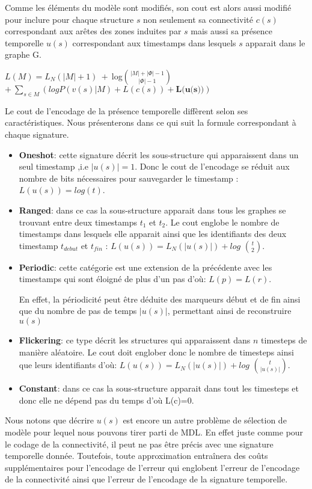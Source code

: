 \documentclass[11pt,a4paper]{report}
\theoremstyle{definition}
\begin{document}
			 Comme les éléments du modèle sont modifiés, son cout est alors aussi modifié pour inclure pour chaque structure $s$ non seulement sa connectivité $c(s)$ correspondant aux arêtes des zones induites par $s$ mais aussi sa présence temporelle $u(s)$ correspondant aux timestamps dans lesquels $s$ apparait dans le graphe G. 
			 
			 $L(M) = L_{N}(|M|+1)\ +\ $log${|M|+|\Phi|-1}\choose{|\Phi|-1}$ $+\ \displaystyle{\sum_{s\in M}(logP(v(s)|M) + L(c(s)) + \textbf{L(u(s))})}$
			 
			 Le cout de l'encodage de la présence temporelle diffèrent selon ses caractéristiques. Nous présenterons dans ce qui suit la formule correspondant à chaque signature.
			 
			 \begin{itemize}[label=$\circ$]
			 \item \textbf{Oneshot}: cette signature décrit les sous-structure qui apparaissent dans un seul timestamp ,i.e $|u(s)|=1$. Donc le cout de l'encodage se réduit aux nombre de bits nécessaires pour sauvegarder le timestamp : $L(u(s)) = log(t)$.
			 \item \textbf{Ranged}: dans ce cas la sous-structure apparait dans tous les graphes se trouvant entre deux timestamps $t_{1}$ et $t_{2}$. Le cout englobe le nombre de timestamps dans lesquels elle apparait ainsi que les identifiants des deux timestamp $t_{debut}$ et $t_{fin}$ : $L(u(s)) = L_{N}(|u(s)|) +log$ ${t}\choose{2}$.
			 \item \textbf{Periodic}: cette catégorie est une extension   de la précédente avec les timestamps qui sont éloigné de plus d'un pas d'où: $L(p) = L(r)$.
			 
			 En effet, la périodicité peut être déduite des marqueurs début et de fin ainsi que du nombre de pas de temps $|u(s)|$, permettant ainsi de reconstruire $u(s)$
			 \item \textbf{Flickering}: ce type décrit les structures qui apparaissent dans $n$ timesteps de manière aléatoire. Le cout doit englober donc le nombre de timesteps ainsi que leurs identifiants d'où: 
			 $L(u(s)) = L_{N}(|u(s)|) +log$ ${t}\choose{|u(s)|}$.
			 \item \textbf{Constant}: dans ce cas la sous-structure apparait dans tout les timesteps et donc elle ne dépend pas du temps d'où L(c)=0.
			 \end{itemize}
			 
			 
			 Nous notons que décrire $u(s)$ est encore un autre problème de sélection de modèle pour lequel nous pouvons tirer parti de MDL. En effet juste comme pour le codage de la connectivité, il peut ne pas être précis avec une signature temporelle donnée. Toutefois, toute approximation entraînera des coûts supplémentaires pour l'encodage de l'erreur qui englobent l'erreur de l'encodage de la connectivité ainsi que l'erreur de l'encodage de la signature temporelle.
			 
\end{document}
